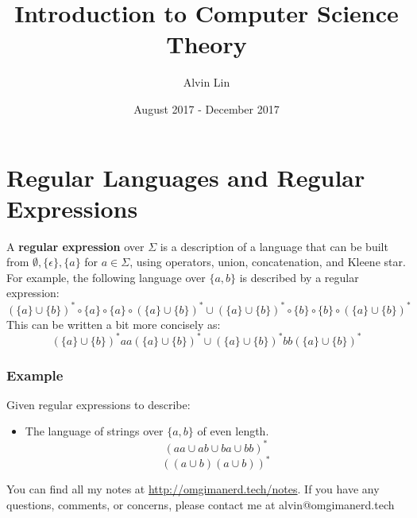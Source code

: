 \documentclass[letterpaper, 12pt]{math}
\title{Introduction to Computer Science Theory}
\author{Alvin Lin}
\date{August 2017 - December 2017}
\begin{document}
\maketitle

\section*{Regular Languages and Regular Expressions}
A \textbf{regular expression} over \( \Sigma \) is a description of a language
that can be built from \( \emptyset,\{\epsilon\},\{a\} \) for \( a\in\Sigma \),
using operators, union, concatenation, and Kleene star. For example, the
following language over \( \{a,b\} \) is described by a regular expression:
\[ (\{a\}\cup\{b\})^*\circ\{a\}\circ\{a\}\circ(\{a\}\cup\{b\})^*\cup
  (\{a\}\cup\{b\})^*\circ\{b\}\circ\{b\}\circ(\{a\}\cup\{b\})^* \]
This can be written a bit more concisely as:
\[ (\{a\}\cup\{b\})^*aa(\{a\}\cup\{b\})^*\cup
  (\{a\}\cup\{b\})^*bb(\{a\}\cup\{b\})^* \]

\subsubsection*{Example}
Given regular expressions to describe:
\begin{itemize}
  \item The language of strings over \( \{a,b\} \) of even length.
  \[ (aa\cup ab\cup ba\cup bb)^* \]
  \[ ((a\cup b)(a\cup b))^* \]
\end{itemize}

\begin{center}
  You can find all my notes at \url{http://omgimanerd.tech/notes}. If you have
  any questions, comments, or concerns, please contact me at
  alvin@omgimanerd.tech
\end{center}
\end{document}
